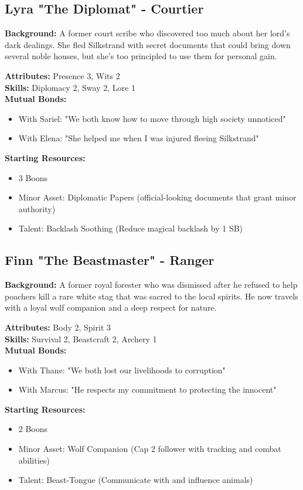 \documentclass[11pt]{article}
\newenvironment{characterbox}[1]{%
  \begin{mdframed}[backgroundcolor=shadecolor, linewidth=1pt, linecolor=headercolor]%
  \subsection*{#1}%
}{%
  \end{mdframed}%
}
\begin{document}
\begin{characterbox}{Lyra "The Diplomat" - Courtier}
\textbf{Background:} A former court scribe who discovered too much about her lord's dark dealings. She fled Silkstrand with secret documents that could bring down several noble houses, but she's too principled to use them for personal gain.

\textbf{Attributes:} Presence 3, Wits 2 \\
\textbf{Skills:} Diplomacy 2, Sway 2, Lore 1 \\
\textbf{Mutual Bonds:} 
\begin{itemize}
\item With Sariel: "We both know how to move through high society unnoticed"
\item With Elena: "She helped me when I was injured fleeing Silkstrand"
\end{itemize}

\textbf{Starting Resources:}
\begin{itemize}
\item 3 Boons
\item Minor Asset: Diplomatic Papers (official-looking documents that grant minor authority)
\item Talent: Backlash Soothing (Reduce magical backlash by 1 SB)
\end{itemize}
\end{characterbox}

\begin{characterbox}{Finn "The Beastmaster" - Ranger}
\textbf{Background:} A former royal forester who was dismissed after he refused to help poachers kill a rare white stag that was sacred to the local spirits. He now travels with a loyal wolf companion and a deep respect for nature.

\textbf{Attributes:} Body 2, Spirit 3 \\
\textbf{Skills:} Survival 2, Beastcraft 2, Archery 1 \\
\textbf{Mutual Bonds:} 
\begin{itemize}
\item With Thane: "We both lost our livelihoods to corruption"
\item With Marcus: "He respects my commitment to protecting the innocent"
\end{itemize}

\textbf{Starting Resources:}
\begin{itemize}
\item 2 Boons
\item Minor Asset: Wolf Companion (Cap 2 follower with tracking and combat abilities)
\item Talent: Beast-Tongue (Communicate with and influence animals)
\end{itemize}
\end{characterbox}
\end{document}
